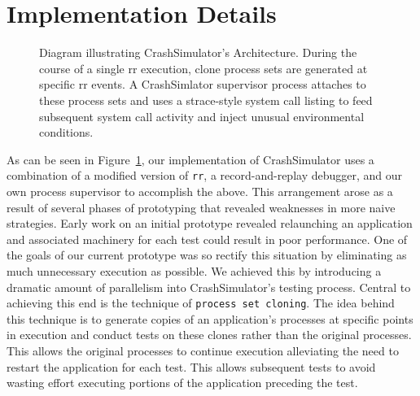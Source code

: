 \section{Implementation Details}
\label{SEC:Implementation}

\begin{figure}[t]
  \center{}
  \caption{Diagram illustrating CrashSimulator's Architecture.  During the
    course of a single rr execution, clone process sets are generated at
    specific rr events.  A CrashSimlator supervisor process attaches to
    these process sets and uses a strace-style system call listing to feed
    subsequent system call activity and inject unusual environmental
    conditions.}
  \label{figure:architecture}
\end{figure}

As can be seen in Figure~\ref{figure:architecture},
our implementation of CrashSimulator uses a combination of a modified
version of {\tt rr}, a
record-and-replay debugger, and our own process supervisor
to accomplish the above.  This arrangement arose as a result of several
phases of prototyping that revealed weaknesses in more naive strategies.
Early work on an initial prototype revealed relaunching an
application and associated machinery for each test could result in
poor performance.  One of the goals of our current prototype
was so rectify this situation by eliminating as much unnecessary execution
as possible.  We achieved this by introducing a dramatic amount of
parallelism into CrashSimulator's testing process.
Central to achieving this end is the technique of
{\tt process set cloning}.  The idea behind this technique
is to generate copies
of an application's processes at specific points in execution and conduct
tests on these clones rather than the original processes.  This allows the
original processes to continue execution alleviating the need to restart
the application for each test.  This allows subsequent tests
to avoid wasting effort executing portions of the application preceding
the test.

